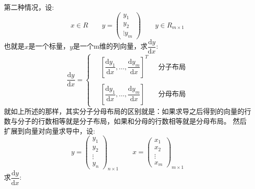 \documentclass[withoutpreface,bwprint]{cumcmthesis} %
\begin{document}
第二种情况，设:
\begin{equation*}
	x \in R  \quad \quad y=\left( 
	\begin{array}{c}
		y_1\\
		y_2\\
		
		\vdots
		y_m
	\end{array}
	\right) \quad \quad y \in R_{m\times1}
\end{equation*}
也就是$x$是一个标量，$y$是一个m维的列向量，求$\dfrac{\mathrm{d} y}{\mathrm{d} x}$:
\begin{equation}
	\dfrac{\mathrm{d} y}{\mathrm{d} x}=\begin{cases}
		\quad \left[ 
		\dfrac{\mathrm{d} y_1}{\mathrm{d} x}
		,\ldots,\dfrac{\mathrm{d} y_m}{\mathrm{d} x}
		\right]^T	& \text{ }  \text{分子布局} 
		\\
		\\
		\quad \left[ 
		\dfrac{\mathrm{d} y_1}{\mathrm{d} x}
		,\ldots,\dfrac{\mathrm{d} y_m}{\mathrm{d} x}
		\right] &	 \text{ }  \text{分母布局}
	\end{cases}	
\end{equation}
就如上所述的那样，其实分子分母布局的区别就是：如果求导之后得到的向量的行数与分子的行数相等就是分子布局，如果和分母的行数相等就是分母布局。
	然后扩展到向量对向量求导中，设:
	\begin{equation}
		y=\left(
			\begin{array}{c}
				y_1\\
				y_2\\
				\vdots\\
				y_n
			\end{array}
		\right)_{n\times1} \quad \quad 
		x=\left( 
				\begin{array}{c}
				x_1\\
				x_2\\
				\vdots\\
				x_m
			\end{array}
		\right)_{m\times1}
	\end{equation}求$\dfrac{\mathrm{d} y}{\mathrm{d} x}$:
\end{document}
